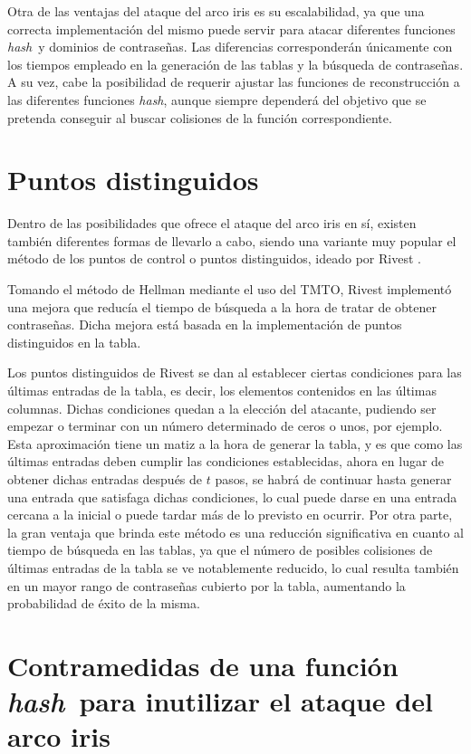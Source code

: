 \documentclass[12pt,spanish,listoffigures,listoftables]{tfgetsinf}
\newcommand{\hash}{\textit{hash}}
\begin{document}
Otra de las ventajas del ataque del arco iris es su escalabilidad, ya que una correcta implementación del mismo puede servir para atacar diferentes funciones \hash~y dominios de contraseñas. Las diferencias corresponderán únicamente con los tiempos empleado en la generación de las tablas y la búsqueda de contraseñas. A su vez, cabe la posibilidad de requerir ajustar las funciones de reconstrucción a las diferentes funciones \hash, aunque siempre dependerá del objetivo que se pretenda conseguir al buscar colisiones de la función correspondiente.

\section{Puntos distinguidos}

Dentro de las posibilidades que ofrece el ataque del arco iris en sí, existen también diferentes formas de llevarlo a cabo, siendo una variante muy popular el método de los puntos de control o puntos distinguidos, ideado por Rivest \cite{rivest}.

Tomando el método de Hellman \cite{hellman} mediante el uso del TMTO, Rivest implementó una mejora que reducía el tiempo de búsqueda a la hora de tratar de obtener contraseñas. Dicha mejora está basada en la implementación de puntos distinguidos en la tabla.

Los puntos distinguidos de Rivest se dan al establecer ciertas condiciones para las últimas entradas de la tabla, es decir, los elementos contenidos en las últimas columnas. Dichas condiciones quedan a la elección del atacante, pudiendo ser empezar o terminar con un número determinado de ceros o unos, por ejemplo. Esta aproximación tiene un matiz a la hora de generar la tabla, y es que como las últimas entradas deben cumplir las condiciones establecidas, ahora en lugar de obtener dichas entradas después de $t$ pasos, se habrá de continuar hasta generar una entrada que satisfaga dichas condiciones, lo cual puede darse en una entrada cercana a la inicial o puede tardar más de lo previsto en ocurrir. Por otra parte, la gran ventaja que brinda este método es una reducción significativa en cuanto al tiempo de búsqueda en las tablas, ya que el número de posibles colisiones de últimas entradas de la tabla se ve notablemente reducido, lo cual resulta también en un mayor rango de contraseñas cubierto por la tabla, aumentando la probabilidad de éxito de la misma.

\section{Contramedidas de una función \hash~para inutilizar el ataque del arco iris} \label{salt}
\end{document}
